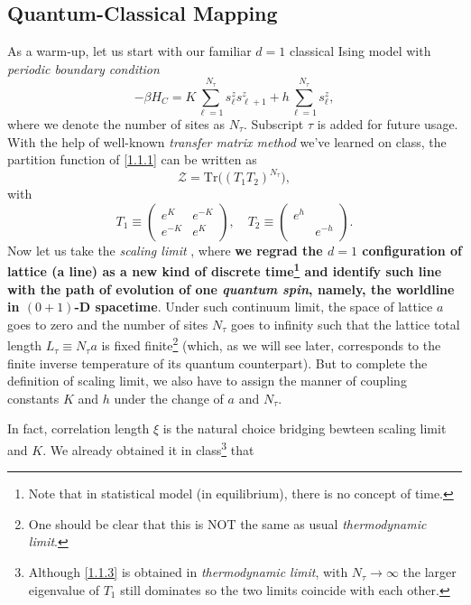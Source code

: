 \documentclass[10pt,nofootinbib]{revtex4}
\newcounter{Note}[section]
\def\Z{\mathcal{Z}}
\numberwithin{equation}{section}
\begin{document}
	\subsection{Quantum-Classical Mapping}
		As a warm-up, let us start with our familiar $d=1$ classical Ising model with \emph{periodic boundary condition}
		\begin{equation}\label{1.1.1}
			-\beta H_{C}=K\sum_{\ell=1}^{N_\tau}s_\ell^zs_{\ell+1}^z+h\sum_{\ell=1}^{N_\tau}s_\ell^z,
		\end{equation}
		where we denote the number of sites as $N_\tau$. Subscript $\tau$ is added for future usage. With the help of well-known \emph{transfer matrix method} we've learned on class, the partition function of \eqref{1.1.1} can be written as 
		\begin{equation}\label{1.1.2}
			\Z=\mathrm{Tr}\bigg((T_1 T_2)^{N_\tau}\bigg),
		\end{equation}
		with
		\begin{equation*}
			T_1\equiv \left(\begin{array}{cc}
				e^K & e^{-K} \\ e^{-K} & e^K
			\end{array}\right),\quad
			T_2\equiv \left(\begin{array}{cc}
				e^h & \\
				& e^{-h}
			\end{array}\right). 
		\end{equation*}
		\indent Now let us take the \emph{scaling limit} \cite{sachdev2011quantum}, where \textbf{we regrad the $d=1$ configuration of lattice (a line) as a new kind of discrete time\footnote{Note that in statistical model (in equilibrium), there is no concept of time.} and identify such line with the path of evolution of one \emph{quantum spin}, namely, the worldline in $(0+1)$-D spacetime}. Under such continuum limit, the space of lattice $a$ goes to zero and the number of sites $N_\tau$ goes to infinity such that the lattice total length $L_\tau\equiv N_\tau a$ is fixed finite\footnote{One should be clear that this is NOT the same as usual \emph{thermodynamic limit}.} (which, as we will see later, corresponds to the finite inverse temperature of its quantum counterpart). But to complete the definition of scaling limit, we also have to assign the manner of coupling constants $K$ and $h$ under the change of $a$ and $N_\tau$.\par
		In fact, correlation length $\xi$ is the natural choice bridging bewteen scaling limit and $K$. We already obtained it in class\footnote{Although \eqref{1.1.3} is obtained in \emph{thermodynamic limit}, with $N_\tau\rightarrow\infty$ the larger eigenvalue of $T_1$ still dominates so the two limits coincide with each other.} that
\end{document}
